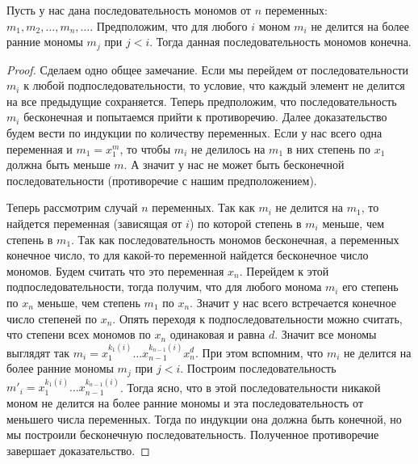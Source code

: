\begin{claim}
Пусть у нас дана последовательность мономов от $n$ переменных: $m_1, m_2, \ldots, m_n,\ldots$.
Предположим, что для любого $i$ моном $m_i$ не делится на более ранние мономы $m_j$ при $j < i$.
Тогда данная последовательность мономов конечна.
\end{claim}
\begin{proof}
Сделаем одно общее замечание.
Если мы перейдем от последовательности $m_i$ к любой подпоследовательности, то условие, что каждый элемент не делится на все предыдущие сохраняется.
Теперь предположим, что последовательность $m_i$ бесконечная и попытаемся прийти к противоречию.
Далее доказательство будем вести по индукции по количеству переменных.
Если у нас всего одна переменная и $m_1 = x_1^m$, то чтобы $m_i$ не делилось на $m_1$ в них степень по $x_1$ должна быть меньше $m$.
А значит у нас не может быть бесконечной последовательности (противоречие с нашим предположением).

Теперь рассмотрим случай $n$ переменных.
Так как $m_i$ не делится на $m_1$, то найдется переменная (зависящая от $i$) по которой степень в $m_i$ меньше, чем степень в $m_1$.
Так как последовательность мономов бесконечная, а переменных конечное число, то для какой-то переменной найдется бесконечное число мономов.
Будем считать что это переменная $x_n$.
Перейдем к этой подпоследовательности, тогда получим, что для любого монома $m_i$ его степень по $x_n$ меньше, чем степень $m_1$ по $x_n$.
Значит у нас всего встречается конечное число степеней по $x_n$.
Опять переходя к подпоследовательности можно считать, что степени всех мономов по $x_n$ одинаковая и равна $d$.
Значит все мономы выглядят так $m_i = x_1^{k_1(i)}\ldots x_{n-1}^{k_{n-1}(i)} x_n ^d$.
При этом вспомним, что $m_i$ не делится на более ранние мономы $m_j$ при $j < i$.
Построим последовательность $m'_i = x_1^{k_1(i)}\ldots x_{n-1}^{k_{n-1}(i)}$.
Тогда ясно, что в этой последовательности никакой моном не делится на более ранние мономы и эта последовательность от меньшего числа переменных.
Тогда по индукции она должна быть конечной, но мы построили бесконечную последовательность.
Полученное противоречие завершает доказательство.
\end{proof}


